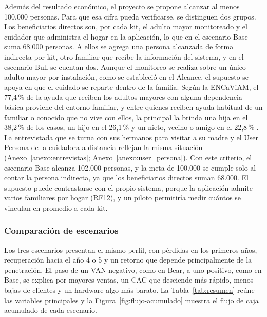 Además del resultado económico, el proyecto se propone alcanzar al menos 100.000 personas.
Para que esa cifra pueda verificarse, se distinguen dos grupos.
Los beneficiarios directos son, por cada kit, el adulto mayor monitoreado y el cuidador que administra el hogar en la aplicación, lo que en el escenario Base suma 68.000 personas.
A ellos se agrega una persona alcanzada de forma indirecta por kit, otro familiar que recibe la información del sistema, y en el escenario Bull se cuentan dos.
Aunque el monitoreo se realiza sobre un único adulto mayor por instalación, como se estableció en el Alcance, el supuesto se apoya en que el cuidado se reparte dentro de la familia.
Según la ENCaViAM, el 77,4\,\% de la ayuda que reciben los adultos mayores con alguna dependencia básica proviene del entorno familiar, y entre quienes reciben ayuda habitual de un familiar o conocido que no vive con ellos, la principal la brinda una hija en el 38,2\,\% de los casos, un hijo en el 26,1\,\% y un nieto, vecino o amigo en el 22,8\,\% \parencite{INDEC2014}.
La entrevistada que se turna con sus hermanos para visitar a su madre y el User Persona de la cuidadora a distancia reflejan la misma situación (Anexo~\ref{anexo:entrevistas}; Anexo~\ref{anexo:user_persona}).
Con este criterio, el escenario Base alcanza 102.000 personas, y la meta de 100.000 se cumple solo al contar la persona indirecta, ya que los beneficiarios directos suman 68.000.
El supuesto puede contrastarse con el propio sistema, porque la aplicación admite varios familiares por hogar (RF12), y un piloto permitiría medir cuántos se vinculan en promedio a cada kit.

\subsubsection{Comparación de escenarios}

Los tres escenarios presentan el mismo perfil, con pérdidas en los primeros años, recuperación hacia el año 4 o 5 y un retorno que depende principalmente de la penetración.
El paso de un VAN negativo, como en Bear, a uno positivo, como en Base, se explica por mayores ventas, un CAC que desciende más rápido, menos bajas de clientes y un hardware algo más barato.
La Tabla~\ref{tab:resumen} reúne las variables principales y la Figura~\ref{fig:flujo-acumulado} muestra el flujo de caja acumulado de cada escenario.

